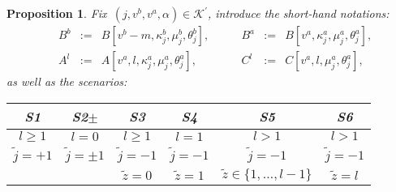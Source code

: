 \documentclass{amsart}[11pt]
\numberwithin{equation}{section}
\newtheorem{proposition}[theorem]{Proposition}
\theoremstyle{definition}
\newcommand{\Kk}{\mathcal{K}}
\begin{document}
\begin{proposition}\label{prop:qbarcal}
Fix~$(j, v^b, v^a, \alpha)\in \Kk^\prime$, 
introduce the short-hand notations:
\begin{equation*}
\begin{array}{lrlllrl}
 & \displaystyle {B}^b & := & B[{v}^b - {m}, \kappa^b_{{j}}, \mu^b_{{j}}, \theta^b_{{j}}],
 & \qquad \displaystyle {B}^a & := & B[{v}^a, \kappa^a_{{j}}, \mu^a_{{j}}, \theta^a_{{j}}],\\
 & \displaystyle {A}^{l} & := & A[{v}^a, {l}, \kappa_{{j}}^a, \mu_{{j}}^a, \theta_{{j}}^a],
 & \qquad \displaystyle {C}^{l} & := & C[{v}^a, l, \mu_{{j}}^a, \theta_{{j}}^a],
\end{array}
\end{equation*}
as well as the scenarios:
\begin{table}[!htp]
\centering
\begin{tabular}{|c|c|c|c|c|c|}
\hline
S1 & S2$\pm$ & S3 & S4 & S5 & S6\\
\hline
${l}\geq 1$ & $l=0$ & $l\geq 1$ & $l = 1$ & $l > 1$ & $l>1$\\
$ \tilde{j} = +1$ & $\tilde{j} = \pm 1$ & $\tilde{j} = -1$ & $\tilde{j} = -1$ & $\tilde{j} = -1$ & $ \tilde{j} = -1$\\
& &$ \tilde{z} =0$ & $\tilde{z} = 1$ & $\tilde{z} \in \{1, \dots, {l} -1\}$ & $\tilde{z} = {l}$\\
\hline
\end{tabular}
\end{table}

\vspace{0.1cm}


\end{proposition}
\end{document}
